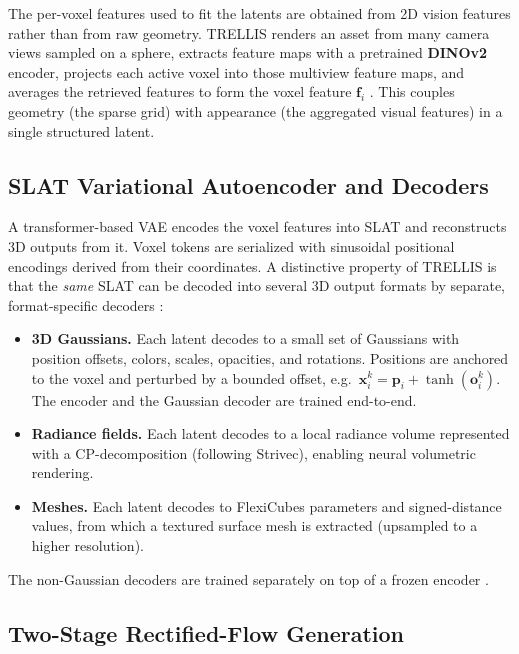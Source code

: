 \documentclass[11pt,a4paper]{article}
\begin{document}
The per-voxel features used to fit the latents are obtained from 2D vision features rather than
from raw geometry. TRELLIS renders an asset from many camera views sampled on a sphere, extracts
feature maps with a pretrained \textbf{DINOv2} encoder, projects each active voxel into those
multiview feature maps, and averages the retrieved features to form the voxel feature
$\boldsymbol{f}_i$ \cite{xiang2024trellis}. This couples geometry (the sparse grid) with
appearance (the aggregated visual features) in a single structured latent.

\subsection{SLAT Variational Autoencoder and Decoders}

A transformer-based VAE encodes the voxel features into SLAT and reconstructs 3D outputs from
it. Voxel tokens are serialized with sinusoidal positional encodings derived from their
coordinates. A distinctive property of TRELLIS is that the \emph{same} SLAT can be decoded into
several 3D output formats by separate, format-specific decoders \cite{xiang2024trellis}:

\begin{itemize}
    \item \textbf{3D Gaussians.} Each latent decodes to a small set of Gaussians with position
    offsets, colors, scales, opacities, and rotations. Positions are anchored to the voxel and
    perturbed by a bounded offset, e.g.\ $\boldsymbol{x}_i^k = \boldsymbol{p}_i +
    \tanh(\boldsymbol{o}_i^k)$. The encoder and the Gaussian decoder are trained end-to-end.
    \item \textbf{Radiance fields.} Each latent decodes to a local radiance volume represented
    with a CP-decomposition (following Strivec), enabling neural volumetric rendering.
    \item \textbf{Meshes.} Each latent decodes to FlexiCubes parameters and signed-distance
    values, from which a textured surface mesh is extracted (upsampled to a higher resolution).
\end{itemize}

The non-Gaussian decoders are trained separately on top of a frozen encoder
\cite{xiang2024trellis}.

\subsection{Two-Stage Rectified-Flow Generation}
\end{document}
